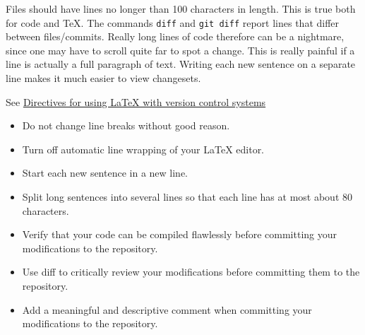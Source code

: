 Files should have lines no longer than 100 characters in length.
This is true both for code and \TeX.
The commands \texttt{diff} and \texttt{git diff} report lines that differ between files/commits.
Really long lines of code therefore can be a nightmare, since one may have to scroll quite far to spot a change.
This is really painful if a line is actually a full paragraph of text.
Writing each new sentence on a separate line makes it much easier to view changesets.

See \href{https://en.wikibooks.org/wiki/LaTeX/Collaborative_Writing_of_LaTeX_Documents\#Subversion_really_makes_the_difference}{Directives for using LaTeX with version control systems}
\begin{itemize}
\item Do not change line breaks without good reason.
\item Turn off automatic line wrapping of your LaTeX editor.
\item Start each new sentence in a new line.
\item Split long sentences into several lines so that each line has at most about 80 characters.
\item Verify that your code can be compiled flawlessly before committing your modifications to the repository.
\item Use diff to critically review your modifications before committing them to the repository.
\item Add a meaningful and descriptive comment when committing your modifications to the repository.
\end{itemize}
